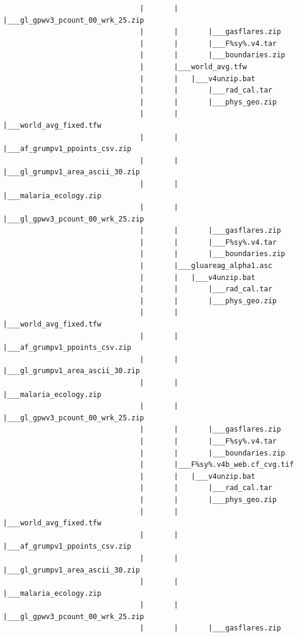 \documentclass[]{book}
\begin{document}
\begin{verbatim}
                                |       |       |___gl_gpwv3_pcount_00_wrk_25.zip
                                |       |       |___gasflares.zip
                                |       |       |___F%sy%.v4.tar
                                |       |       |___boundaries.zip
                                |       |___world_avg.tfw
                                |       |   |___v4unzip.bat
                                |       |       |___rad_cal.tar
                                |       |       |___phys_geo.zip
                                |       |       |___world_avg_fixed.tfw
                                |       |       |___af_grumpv1_ppoints_csv.zip
                                |       |       |___gl_grumpv1_area_ascii_30.zip
                                |       |       |___malaria_ecology.zip
                                |       |       |___gl_gpwv3_pcount_00_wrk_25.zip
                                |       |       |___gasflares.zip
                                |       |       |___F%sy%.v4.tar
                                |       |       |___boundaries.zip
                                |       |___gluareag_alpha1.asc
                                |       |   |___v4unzip.bat
                                |       |       |___rad_cal.tar
                                |       |       |___phys_geo.zip
                                |       |       |___world_avg_fixed.tfw
                                |       |       |___af_grumpv1_ppoints_csv.zip
                                |       |       |___gl_grumpv1_area_ascii_30.zip
                                |       |       |___malaria_ecology.zip
                                |       |       |___gl_gpwv3_pcount_00_wrk_25.zip
                                |       |       |___gasflares.zip
                                |       |       |___F%sy%.v4.tar
                                |       |       |___boundaries.zip
                                |       |___F%sy%.v4b_web.cf_cvg.tif
                                |       |   |___v4unzip.bat
                                |       |       |___rad_cal.tar
                                |       |       |___phys_geo.zip
                                |       |       |___world_avg_fixed.tfw
                                |       |       |___af_grumpv1_ppoints_csv.zip
                                |       |       |___gl_grumpv1_area_ascii_30.zip
                                |       |       |___malaria_ecology.zip
                                |       |       |___gl_gpwv3_pcount_00_wrk_25.zip
                                |       |       |___gasflares.zip

\end{verbatim}
\end{document}
